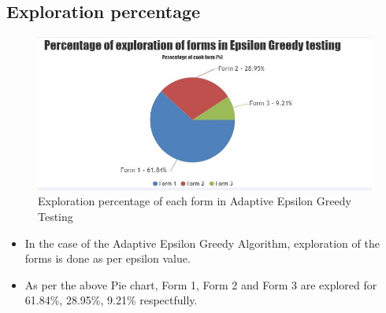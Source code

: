 \documentclass[12pt]{report}
\begin{document}
\subsection{Exploration percentage}
\begin{figure}[H]
\caption{Exploration percentage of each form in Adaptive Epsilon Greedy Testing}
\includegraphics[scale=0.8]{epsilonpie.jpg}
\end{figure}
\begin{itemize}
\item In the case of the Adaptive Epsilon Greedy Algorithm, exploration of the forms is done as per epsilon value.
\item As per the above Pie chart, Form 1, Form 2 and Form 3 are explored for 61.84\%, 28.95\%, 9.21\% respectfully.
\end{itemize}
\end{document}
